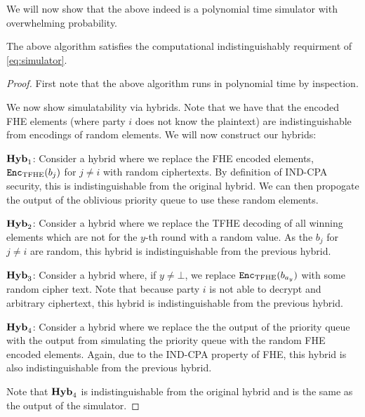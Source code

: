We will now show that the above indeed is a polynomial time simulator with overwhelming probability.
\begin{lemma}
	The above algorithm satisfies the computational indistinguishably requirment of \cref{eq:simulator}.
	\begin{proof}
		First note that the above algorithm runs in polynomial time by inspection.
		
		We now show simulatability via hybrids.
		Note that we have that the encoded FHE elements (where party $i$ does not know the plaintext)
		are indistinguishable from encodings of random elements. We will now construct our hybrids:
		
		$\mathrm{\textbf{Hyb}}_{1}$: Consider a hybrid where we replace the FHE encoded elements, $\texttt{Enc}_{\mathrm{TFHE}}(b_j)$ for $j \neq i$ with random ciphertexts.
		By definition of IND-CPA security, this is indistinguishable from the original hybrid. We can then propogate the output of the oblivious priority queue
		to use these random elements.

		$\mathrm{\textbf{Hyb}}_{2}$: Consider a hybrid where we replace the TFHE decoding of all winning elements which are not for the $y$-th round with a random value.
		As the $b_j$ for $j \neq i$ are random, this hybrid is indistinguishable from the previous hybrid.

		$\mathrm{\textbf{Hyb}}_{3}$: Consider a hybrid where, if $y \neq \bot$, we replace $\texttt{Enc}_{\mathrm{TFHE}}(b_{a_y})$ with some random cipher text. Note that because party 
		$i$ is not able to decrypt and arbitrary ciphertext, this hybrid is indistinguishable from the previous hybrid.

		$\mathrm{\textbf{Hyb}}_{4}$: Consider a hybrid where we replace the the output of the priority queue with the output from simulating the priority queue with the random FHE encoded elements.
		Again, due to the IND-CPA property of FHE, this hybrid is also indistinguishable from the previous hybrid.
		
		Note that $\mathrm{\textbf{Hyb}}_{4}$ is indistinguishable from the original hybrid and is the same as the output of the simulator.
	\end{proof}
\end{lemma}